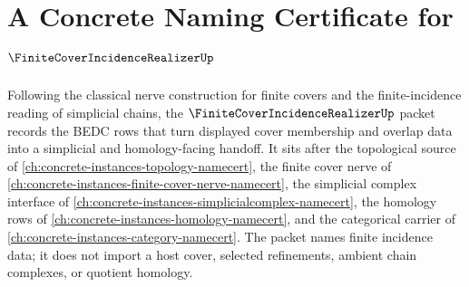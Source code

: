 \chapter{A Concrete Naming Certificate for $\FiniteCoverIncidenceRealizerUp$}
\label{ch:concrete-instances-finite-cover-incidence-realizer-namecert}

Following the classical nerve construction for finite covers and the finite-incidence reading of simplicial chains, the $\FiniteCoverIncidenceRealizerUp$ packet records the BEDC rows that turn displayed cover membership and overlap data into a simplicial and homology-facing handoff. It sits after the topological source of \autoref{ch:concrete-instances-topology-namecert}, the finite cover nerve of \autoref{ch:concrete-instances-finite-cover-nerve-namecert}, the simplicial complex interface of \autoref{ch:concrete-instances-simplicialcomplex-namecert}, the homology rows of \autoref{ch:concrete-instances-homology-namecert}, and the categorical carrier of \autoref{ch:concrete-instances-category-namecert}. The packet names finite incidence data; it does not import a host cover, selected refinements, ambient chain complexes, or quotient homology.

